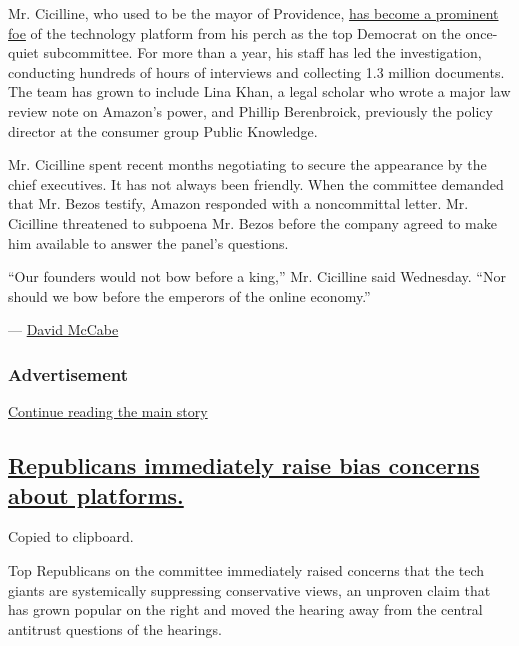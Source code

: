 Mr. Cicilline, who used to be the mayor of Providence,
\href{https://www.nytimes3xbfgragh.onion/2019/12/08/technology/David-Cicilline-antitrust-tech.html}{has
become a prominent foe} of the technology platform from his perch as the
top Democrat on the once-quiet subcommittee. For more than a year, his
staff has led the investigation, conducting hundreds of hours of
interviews and collecting 1.3 million documents. The team has grown to
include Lina Khan, a legal scholar who wrote a major law review note on
Amazon's power, and Phillip Berenbroick, previously the policy director
at the consumer group Public Knowledge.

Mr. Cicilline spent recent months negotiating to secure the appearance
by the chief executives. It has not always been friendly. When the
committee demanded that Mr. Bezos testify, Amazon responded with a
noncommittal letter. Mr. Cicilline threatened to subpoena Mr. Bezos
before the company agreed to make him available to answer the panel's
questions.

``Our founders would not bow before a king,'' Mr. Cicilline said
Wednesday. ``Nor should we bow before the emperors of the online
economy.''

--- \href{https://www.nytimes3xbfgragh.onion/by/david-mccabe}{David
McCabe}

\hypertarget{advertisement}{%
\subsubsection{Advertisement}\label{advertisement}}

\protect\hyperlink{after-dfp-ad-mid1}{Continue reading the main story}

\hypertarget{republicans-immediately-raise-bias-concerns-about-platforms}{%
\subsection{\texorpdfstring{\protect\hyperlink{republicans-immediately-raise-bias-concerns-about-platforms}{Republicans
immediately raise bias concerns about
platforms.}}{Republicans immediately raise bias concerns about platforms.}}\label{republicans-immediately-raise-bias-concerns-about-platforms}}

Copied to clipboard.

Top Republicans on the committee immediately raised concerns that the
tech giants are systemically suppressing conservative views, an unproven
claim that has grown popular on the right and moved the hearing away
from the central antitrust questions of the hearings.

